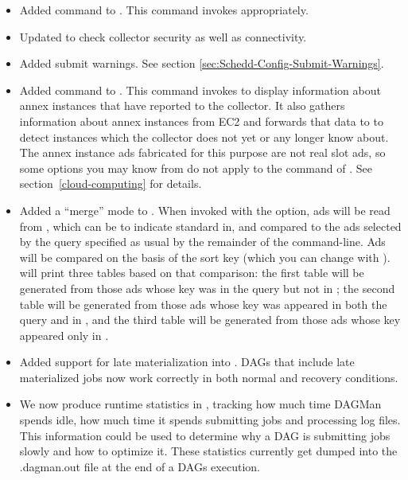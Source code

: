\begin{itemize}

\item Added  command to .  This command invokes
  appropriately.

\item Updated   to check collector security
as well as connectivity.

\item Added submit warnings.  See section \ref{sec:Schedd-Config-Submit-Warnings}.

\item Added  command to .  This command invokes
 to display information about annex instances that have
reported to the collector.  It also gathers information about annex instances
from EC2 and forwards that data to  to detect instances which
the collector does not yet or any longer know about.  The annex instance ads
fabricated for this purpose are not real slot ads, so some options you may
know from  do not apply to the  command of
.  See section~\ref{cloud-computing} for details.

\item Added a ``merge'' mode to .  When invoked with the
 option, ads will be read from , which
can be \Expr{-} to indicate standard in, and compared to the ads selected
by the query specified as usual by the remainder of the command-line.  Ads
will be compared on the basis of the sort key (which you can change with
).   will print three tables based on
that comparison: the first table will be generated from those ads whose key
was in the query but not in ; the second table will be generated
from those ads whose key was appeared in both the query and in ,
and the third table will be generated from those ads whose key appeared
only in .

\item Added support for late materialization into . DAGs that
include late materialized jobs now work correctly in both normal and recovery 
conditions.

\item We now produce runtime statistics in , tracking how 
much time DAGMan spends idle, how much time it spends submitting jobs and
processing log files. This information could be used to determine why a DAG 
is submitting jobs slowly and how to optimize it. These statistics currently get 
dumped into the .dagman.out file at the end of a DAGs execution.


\end{itemize}
